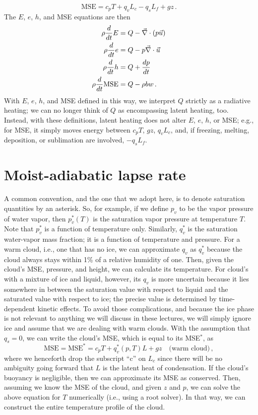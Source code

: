 \documentclass[12pt]{article}
\begin{document}
\begin{equation}
\text{MSE} = c_p T + q_v L_c - q_s L_f + gz \, .
\end{equation}
The $E$, $e$, $h$, and MSE equations are then
\begin{align}
\rho {\frac{d}{dt}} E &= Q - {\vec{\nabla}} \cdot (p\vec{u}) \\
\rho {\frac{d}{dt}} e &= Q - p {\vec{\nabla}} \cdot \vec{u} \\
\rho {\frac{d}{dt}} h &= Q + \frac{dp}{dt} \\
\rho {\frac{d}{dt}} \text{MSE} &= Q - \rho bw \, . \label{gov_mse}
\end{align}
With $E$, $e$, $h$, and MSE defined in this way, we interpret $Q$ strictly as a radiative heating; we can no longer think of $Q$ as encompassing latent heating, too.  Instead, with these definitions, latent heating does not alter $E$, $e$, $h$, or MSE; e.g., for MSE, it simply moves energy between $c_p T$, $gz$, $q_v L_c$, and, if freezing, melting, deposition, or sublimation are involved, $-q_s L_f$.


\section{Moist-adiabatic lapse rate} \label{sec_adiabatic_lapse}


A common convention, and the one that we adopt here, is to denote saturation quantities by an asterisk.  So, for example, if we define $p_v$ to be the vapor pressure of water vapor, then $p_v^*(T)$ is the saturation vapor pressure at temperature $T$.  Note that $p_v^*$ is a function of temperature only.  Similarly, $q_v^*$ is the saturation water-vapor mass fraction; it is a function of temperature and pressure. For a warm cloud, i.e., one that has no ice, we can approximate $q_v$ as $q_v^*$ because the cloud always stays within 1\% of a relative humidity of one.  Then, given the cloud's MSE, pressure, and height, we can calculate its temperature.  For cloud's with a mixture of ice and liquid, however, its $q_v$ is more uncertain because it lies somewhere in between the saturation value with respect to liquid and the saturated value with respect to ice; the precise value is determined by time-dependent kinetic effects.  To avoid those complications, and because the ice phase is not relevant to anything we will discuss in these lectures, we will simply ignore ice and assume that we are dealing with warm clouds.  With the assumption that $q_s = 0$, we can write the cloud's MSE, which is equal to its MSE$^*$, as
\[
\text{MSE} = \text{MSE}^* = c_p T + q_v^*(p,T) L + gz \quad \text{(warm cloud)} \, ,
\]
where we henceforth drop the subscript ``c'' on $L_c$ since there will be no ambiguity going forward that $L$ is the latent heat of condensation.  If the cloud's buoyancy is negligible, then we can approximate its MSE as conserved.  Then, assuming we know the MSE of the cloud, and given $z$ and $p$, we can solve the above equation for $T$ numerically (i.e., using a root solver).  In that way, we can construct the entire temperature profile of the cloud.
\end{document}
